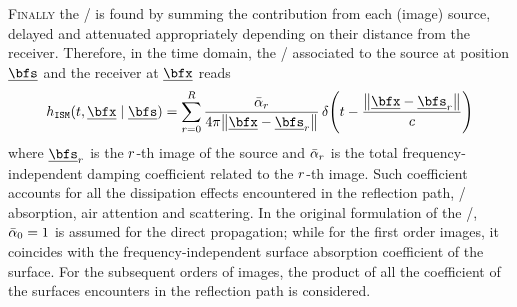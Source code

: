 
\begin{figure}
    \resizebox{\linewidth}{!}{
        
    }
    \label{fig:acoustics:image_model}
\end{figure}



\textsc{Finally} the \RIR/ is found by summing the contribution from each (image) source, delayed and attenuated appropriately depending on their distance from the receiver.
Therefore, in the time domain, the \RIR/ associated to the source at position $\positionSource$ and the receiver at $\positionMicrophone$ reads
\begin{equation}\label{eq:acoustics:ims:time}
    \rir_{\mathtt{ISM}}(t, \positionMicrophone \mid \positionSource) =
    \sum_{\idxEch=0}^{\numEchs}
        \frac{\bar{\absCoeff}_{\idxEch}}{4 \pi \norm{\positionMicrophone - \positionSource_\idxEch}}
        \diracOf{t - \frac{\norm{\positionMicrophone - \positionSource_\idxEch}}{\speedOfSound}}
\end{equation}
where $\positionSource_\idxEch$ is the $r$-th image of the source and $\bar{\alpha}_{r}$
is the total frequency-independent damping coefficient related to the $r$-th image.
Such coefficient accounts for all the dissipation effects encountered in the reflection path, \eg/ absorption, air attention and scattering.
In the original formulation of the \ISM/, $\bar{\alpha}_{0} = 1$ is assumed for the direct propagation;
while for the first order images, it coincides with the frequency-independent surface absorption coefficient of the surface.
For the subsequent orders of images, the product of all the coefficient of the surfaces encounters in the reflection path is considered.

